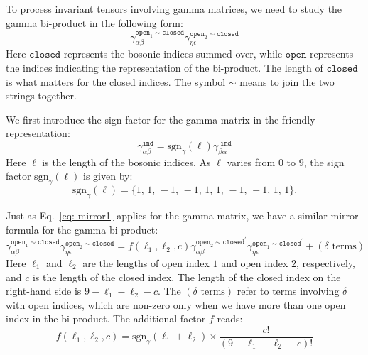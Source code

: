 \documentclass[11pt]{article}
\begin{document}
To process invariant tensors involving gamma matrices, we need to study the gamma bi-product in the following form:
\begin{equation}
    \gamma^{\texttt{open}_1 \sim \texttt{closed}}_{\alpha\beta} \gamma^{\texttt{open}_2 \sim \texttt{closed}}_{\eta\epsilon}
\end{equation}
Here $\texttt{closed}$ represents the bosonic indices summed over, while $\texttt{open}$ represents the indices indicating the representation of the bi-product. The length of $\texttt{closed}$ is what matters for the closed indices. The symbol $\sim$ means to join the two strings together.

We first introduce the sign factor for the gamma matrix in the friendly representation:
\begin{equation}
    \gamma^{\texttt{ind}}_{\alpha\beta} = \text{sgn}_\gamma(\ell) \gamma^{\texttt{ ind}}_{\beta\alpha}
\end{equation}
Here $\ell$ is the length of the bosonic indices. As $\ell$ varies from $0$ to $9$, the sign factor $\text{sgn}_\gamma(\ell)$ is given by:
\begin{equation}
   \text{sgn}_\gamma(\ell) = \{ 1,\, 1,\, -1,\, -1,\, 1,\, 1,\, -1,\, -1,\, 1,\, 1 \}.
\end{equation}

Just as Eq.~\eqref{eq: mirror1} applies for the gamma matrix, we have a similar mirror formula for the gamma bi-product:
\begin{equation}\label{eq: bi-product}
    \gamma^{\texttt{open}_1 \sim \texttt{closed}}_{\alpha\beta} \gamma^{\texttt{open}_2 \sim \texttt{closed}}_{\eta\epsilon} = f(\ell_1, \ell_2, c)\gamma_{\alpha\beta}^{\texttt{open}_2 \sim \texttt{closed}^{'}} \gamma_{\eta\epsilon}^{\texttt{open}_1 \sim \texttt{closed}^{'}} + (\delta \text{ terms})
\end{equation}
Here $\ell_1$ and $\ell_2$ are the lengths of open index $1$ and open index $2$, respectively, and $c$ is the length of the closed index. The length of the closed index on the right-hand side is $9 - \ell_1 - \ell_2 - c$. The $(\delta \text{ terms})$ refer to terms involving $\delta$ with open indices, which are non-zero only when we have more than one open index in the bi-product. The additional factor $f$ reads:
\begin{equation}
    f(\ell_1, \ell_2, c) = \text{sgn}_\gamma(\ell_1 + \ell_2) \times \frac{c!}{(9 - \ell_1 - \ell_2 - c)!}
\end{equation}
\end{document}
